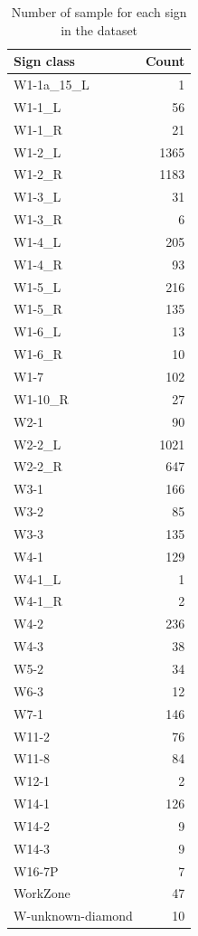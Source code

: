 \begin{appendices}
\begin{table}[]
    \centering
    \begin{tabular}{|l|r|}
    \hline
        \textbf{Sign class} & \textbf{Count} \\ \hline
        W1-1a\_15\_L & 1\\
        W1-1\_L & 56\\
        W1-1\_R & 21\\
        W1-2\_L & 1365\\
        W1-2\_R & 1183\\
        W1-3\_L & 31\\
        W1-3\_R & 6\\
        W1-4\_L & 205\\
        W1-4\_R & 93\\
        W1-5\_L & 216\\
        W1-5\_R & 135\\
        W1-6\_L & 13\\
        W1-6\_R & 10\\
        W1-7 & 102\\
        W1-10\_R & 27\\
        W2-1 & 90\\
        W2-2\_L & 1021\\
        W2-2\_R & 647\\
        W3-1 & 166\\
        W3-2 & 85\\
        W3-3 & 135\\
        W4-1 & 129\\
        W4-1\_L & 1\\
        W4-1\_R & 2\\
        W4-2 & 236\\
        W4-3 & 38\\
        W5-2 & 34\\
        W6-3 & 12\\
        W7-1 & 146\\
        W11-2 & 76\\
        W11-8 & 84\\
        W12-1 & 2\\
        W14-1 & 126\\
        W14-2 & 9\\
        W14-3 & 9\\
        W16-7P & 7\\
        WorkZone & 47\\
        W-unknown-diamond & 10\\
        \hline
    \end{tabular}
    \caption{Number of sample for each sign in the dataset}
    \label{tab:data_count}
\end{table}{}


\end{appendices}
